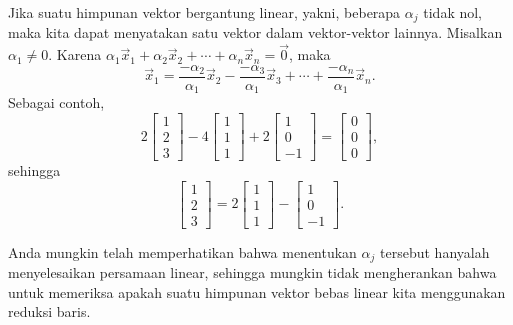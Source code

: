 Jika suatu himpunan vektor bergantung linear, yakni, beberapa $\alpha_j$
tidak nol, maka kita dapat menyatakan satu vektor dalam vektor-vektor lainnya.
Misalkan $\alpha_1 \neq 0$. Karena
$\alpha_1 \vec{x}_1 +
\alpha_2 \vec{x}_2 +
\cdots +
\alpha_n \vec{x}_n
=
\vec{0}$, maka
\begin{equation*}
\vec{x}_1
=
\frac{-\alpha_2}{\alpha_1}
\vec{x}_2 -
\frac{-\alpha_3}{\alpha_1}
\vec{x}_3 +
\cdots +
\frac{-\alpha_n}{\alpha_1}
\vec{x}_n .
\end{equation*}
Sebagai contoh,
\begin{equation*}
2
\begin{bmatrix} 1 \\ 2 \\ 3 \end{bmatrix}
-4
\begin{bmatrix} 1 \\ 1 \\ 1 \end{bmatrix}
+
2 \begin{bmatrix} 1 \\ 0 \\ -1 \end{bmatrix}
=
\begin{bmatrix} 0 \\ 0 \\ 0 \end{bmatrix} ,
\end{equation*}
sehingga
\begin{equation*}
\begin{bmatrix} 1 \\ 2 \\ 3 \end{bmatrix}
=
2
\begin{bmatrix} 1 \\ 1 \\ 1 \end{bmatrix}
-
\begin{bmatrix} 1 \\ 0 \\ -1 \end{bmatrix} .
\end{equation*}

Anda mungkin telah memperhatikan bahwa menentukan $\alpha_j$ tersebut hanyalah menyelesaikan
persamaan linear, sehingga mungkin tidak mengherankan bahwa untuk memeriksa
apakah suatu himpunan vektor bebas linear kita menggunakan reduksi baris.

